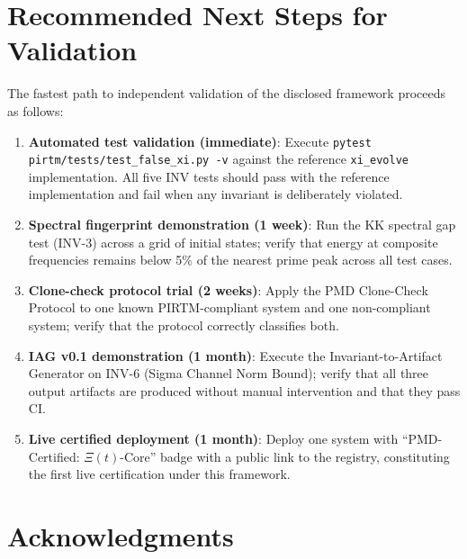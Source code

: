 \documentclass[12pt,letterpaper]{article}
\theoremstyle{definition}
\theoremstyle{remark}
\begin{document}
\section{Recommended Next Steps for Validation}

The fastest path to independent validation of the disclosed framework proceeds as follows:

\begin{enumerate}
\item \textbf{Automated test validation (immediate)}: Execute \texttt{pytest pirtm/tests/test\_false\_xi.py -v} against the reference \texttt{xi\_evolve} implementation. All five INV tests should pass with the reference implementation and fail when any invariant is deliberately violated.

\item \textbf{Spectral fingerprint demonstration (1 week)}: Run the KK spectral gap test (INV-3) across a grid of initial states; verify that energy at composite frequencies remains below 5\% of the nearest prime peak across all test cases.

\item \textbf{Clone-check protocol trial (2 weeks)}: Apply the PMD Clone-Check Protocol to one known PIRTM-compliant system and one non-compliant system; verify that the protocol correctly classifies both.

\item \textbf{IAG v0.1 demonstration (1 month)}: Execute the Invariant-to-Artifact Generator on INV-6 (Sigma Channel Norm Bound); verify that all three output artifacts are produced without manual intervention and that they pass CI.

\item \textbf{Live certified deployment (1 month)}: Deploy one system with ``PMD-Certified: $\Xi(t)$-Core'' badge with a public link to the registry, constituting the first live certification under this framework.
\end{enumerate}

\section*{Acknowledgments}
\end{document}
